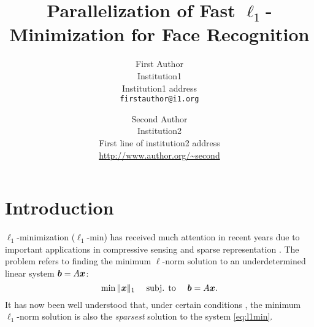 \documentclass[10pt,twocolumn,letterpaper]{article}
\begin{document}
\title{Parallelization of Fast $\ell_1$-Minimization for Face Recognition
}

\author{First Author\\
Institution1\\
Institution1 address\\
{\tt\small firstauthor@i1.org}
\and
Second Author\\
Institution2\\
First line of institution2 address\\
{\small\url{http://www.author.org/~second}}
}

\maketitle

\begin{abstract}

\end{abstract}

\section{Introduction} 
$\ell_1$-minimization ($\ell_1$-min) has received much attention in recent
years due to important applications in compressive sensing
\cite{BrucksteinA2007} and sparse representation \cite{WrightJ2010-PIEEE}.  The
problem refers to finding the minimum $\ell$-norm solution to an
underdetermined linear system ${\boldsymbol{b}}=A{\boldsymbol{x}}$:
\begin{equation}
\min \|{\boldsymbol{x}}\|_1\quad \mbox{ subj. to }\quad {\boldsymbol{b}} = A{\boldsymbol{x}}.
\label{eq:l1min}
\end{equation}
It has now been well understood that, under certain conditions
\cite{CandesE2005-IT_1,DonohoD2004}, the minimum $\ell_1$-norm solution is also
the \emph{sparsest} solution to the system \eqref{eq:l1min}.
\end{document}
